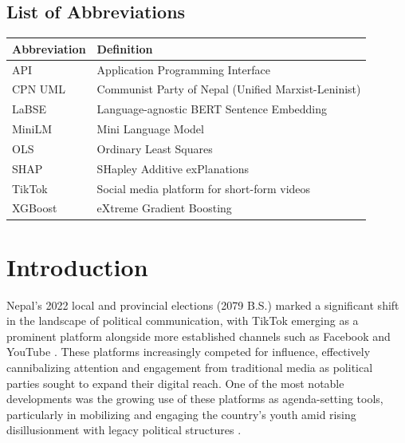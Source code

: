 \documentclass[12pt,a4paper]{report}
\begin{document}
\clearpage
\tableofcontents

\clearpage
\listoftables

\clearpage
\section*{List of Abbreviations}
\begin{tabular}{ll}
\textbf{Abbreviation} & \textbf{Definition} \\
\hline
API & Application Programming Interface \\
CPN UML & Communist Party of Nepal (Unified Marxist-Leninist) \\
LaBSE & Language-agnostic BERT Sentence Embedding \\
MiniLM & Mini Language Model \\
OLS & Ordinary Least Squares \\
SHAP & SHapley Additive exPlanations \\
TikTok & Social media platform for short-form videos \\
XGBoost & eXtreme Gradient Boosting \\
\end{tabular}

\clearpage
{}


\chapter{Introduction}
Nepal’s 2022 local and provincial elections (2079 B.S.) marked a significant shift in the landscape of political communication, with TikTok emerging as a prominent platform alongside more established channels such as Facebook and YouTube \parencite{nepalitimes2025}. These platforms increasingly competed for influence, effectively cannibalizing attention and engagement from traditional media as political parties sought to expand their digital reach. One of the most notable developments was the growing use of these platforms as agenda-setting tools, particularly in mobilizing and engaging the country’s youth amid rising disillusionment with legacy political structures \parencite{FPExplainers2024, dahal2023influence}.
\end{document}
